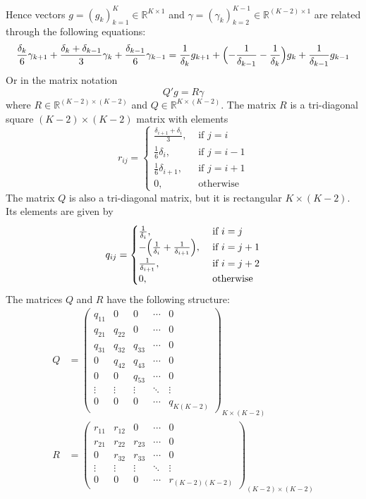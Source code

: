 \documentclass[a4paper]{article}
\newcommand{\Real}{\mathbb{R}}
\begin{document}
Hence vectors $g = (g_k)_{k=1}^K\in \Real^{K\times 1}$ and
$\gamma = (\gamma_k)_{k=2}^{K-1}\in \Real^{(K-2)\times 1}$
are related through the following equations:
\[
\frac{\delta_k}{6} \gamma_{k+1} + \frac{\delta_k+\delta_{k-1}}{3} \gamma_k + \frac{\delta_{k-1}}{6}\gamma_{k-1}
= \frac{1}{\delta_k}g_{k+1} + \Bigl(-\frac{1}{\delta_{k-1}} - \frac{1}{\delta_k}\Bigr)g_k + \frac{1}{\delta_{k-1}}g_{k-1}
\]
Or in the matrix notation
\[Q'g = R\gamma\]
where $R\in \Real^{(K-2)\times(K-2)}$ and $Q\in \Real^{K\times(K-2)}$.
The matrix $R$ is a tri-diagonal square $(K-2)\times(K-2)$ matrix with elements
\[
r_{ij} = \begin{cases}
	\frac{\delta_{i+1}+\delta_i}{3}, &\text{ if } j=i\\
	\frac{1}{6}\delta_i, &\text{ if } j=i-1\\
	\frac{1}{6}\delta_{i+1}, &\text{ if } j=i+1\\
	0, &\text{ otherwise }
\end{cases}
\]
The matrix $Q$ is also a tri-diagonal matrix, but it is rectangular $K\times(K-2)$.
Its elements are given by
\[
q_{ij} = \begin{cases}
	\frac{1}{\delta_i}, &\text{ if } i=j\\
	-\Bigl(\frac{1}{\delta_i}+\frac{1}{\delta_{i+1}}\Bigr), &\text{ if } i=j+1\\
	\frac{1}{\delta_{i+1}}, &\text{ if } i=j+2\\
	0, &\text{ otherwise }
\end{cases}
\]
The matrices $Q$ and $R$ have the following structure:
\begin{align*}
Q &= \begin{pmatrix}
q_{11} 	& 0 		& 0 		& \cdots & 0 \\
q_{21} 	& q_{22} 	& 0 		& \cdots & 0 \\
q_{31} 	& q_{32} 	& q_{33} 	& \cdots & 0 \\
0 		& q_{42} 	& q_{43} 	& \cdots & 0 \\
0 		& 0 		& q_{53} 	& \cdots & 0 \\
\vdots 	& \vdots	& \vdots 	& \ddots & \vdots \\
0 		& 0			& 0 		& \cdots & q_{K(K-2)}
\end{pmatrix}_{K\times (K-2)}\\
R &= \begin{pmatrix}
r_{11} 	& r_{12} 	& 0 		& \cdots & 0 \\
r_{21} 	& r_{22} 	& r_{23} 	& \cdots & 0 \\
0 		& r_{32} 	& r_{33} 	& \cdots & 0 \\
\vdots 	& \vdots	& \vdots 	& \ddots & \vdots \\
0 		& 0			& 0 		& \cdots & r_{(K-2)(K-2)}
\end{pmatrix}_{(K-2)\times (K-2)}
\end{align*}
\end{document}
